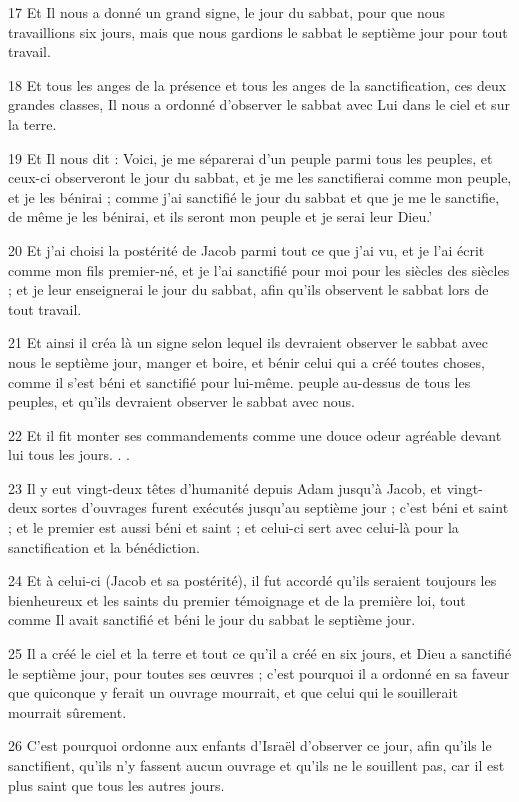 \par 17 Et Il nous a donné un grand signe, le jour du sabbat, pour que nous travaillions six jours, mais que nous gardions le sabbat le septième jour pour tout travail.
\par 18 Et tous les anges de la présence et tous les anges de la sanctification, ces deux grandes classes, Il nous a ordonné d'observer le sabbat avec Lui dans le ciel et sur la terre.
\par 19 Et Il nous dit : Voici, je me séparerai d'un peuple parmi tous les peuples, et ceux-ci observeront le jour du sabbat, et je me les sanctifierai comme mon peuple, et je les bénirai ; comme j'ai sanctifié le jour du sabbat et que je me le sanctifie, de même je les bénirai, et ils seront mon peuple et je serai leur Dieu.'
\par 20 Et j'ai choisi la postérité de Jacob parmi tout ce que j'ai vu, et je l'ai écrit comme mon fils premier-né, et je l'ai sanctifié pour moi pour les siècles des siècles ; et je leur enseignerai le jour du sabbat, afin qu'ils observent le sabbat lors de tout travail.
\par 21 Et ainsi il créa là un signe selon lequel ils devraient observer le sabbat avec nous le septième jour, manger et boire, et bénir celui qui a créé toutes choses, comme il s'est béni et sanctifié pour lui-même. peuple au-dessus de tous les peuples, et qu'ils devraient observer le sabbat avec nous.
\par 22 Et il fit monter ses commandements comme une douce odeur agréable devant lui tous les jours. . .
\par 23 Il y eut vingt-deux têtes d'humanité depuis Adam jusqu'à Jacob, et vingt-deux sortes d'ouvrages furent exécutés jusqu'au septième jour ; c'est béni et saint ; et le premier est aussi béni et saint ; et celui-ci sert avec celui-là pour la sanctification et la bénédiction.
\par 24 Et à celui-ci (Jacob et sa postérité), il fut accordé qu'ils seraient toujours les bienheureux et les saints du premier témoignage et de la première loi, tout comme Il avait sanctifié et béni le jour du sabbat le septième jour.
\par 25 Il a créé le ciel et la terre et tout ce qu'il a créé en six jours, et Dieu a sanctifié le septième jour, pour toutes ses œuvres ; c'est pourquoi il a ordonné en sa faveur que quiconque y ferait un ouvrage mourrait, et que celui qui le souillerait mourrait sûrement.
\par 26 C'est pourquoi ordonne aux enfants d'Israël d'observer ce jour, afin qu'ils le sanctifient, qu'ils n'y fassent aucun ouvrage et qu'ils ne le souillent pas, car il est plus saint que tous les autres jours.

